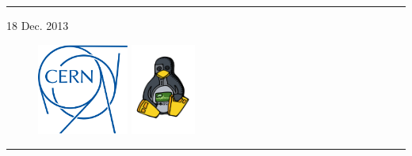 \begin{titlepage}

\vspace*{3cm}


\noindent \rule{\textwidth}{.1cm}

\hfill 18 Dec. 2013

\vspace*{3cm}

\begin{figure}[h]
  \includegraphics[height=3cm]{fig/cern-logo}
  \hfill
  \includegraphics[height=3cm]{fig/ohwr-logo}
\end{figure}

\vfill


\noindent \rule{\textwidth}{.05cm}

\end{titlepage}
